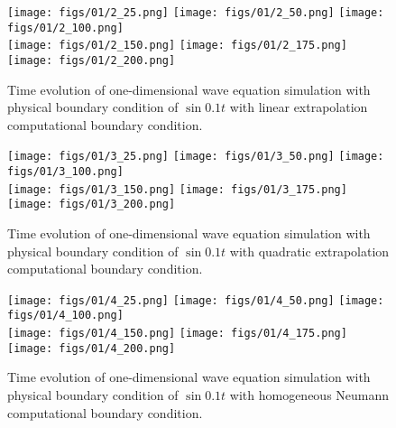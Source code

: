\documentclass[11pt]{article}
\begin{document}
\begin{enumerate}
        \begin{figure}[ht]
        \begin{center}
        \texttt{[image: figs/01/2\_25.png]}
        \texttt{[image: figs/01/2\_50.png]}
        \texttt{[image: figs/01/2\_100.png]}\\
        \texttt{[image: figs/01/2\_150.png]}
        \texttt{[image: figs/01/2\_175.png]}
        \texttt{[image: figs/01/2\_200.png]}\\
        \end{center}
        \caption{Time evolution of one-dimensional wave equation simulation with physical boundary condition
                of $\sin 0.1 t$ with linear extrapolation computational boundary condition.}
        \label{fig2_2}
        \end{figure}

        \begin{figure}[ht]
        \begin{center}
        \texttt{[image: figs/01/3\_25.png]}
        \texttt{[image: figs/01/3\_50.png]}
        \texttt{[image: figs/01/3\_100.png]}\\
        \texttt{[image: figs/01/3\_150.png]}
        \texttt{[image: figs/01/3\_175.png]}
        \texttt{[image: figs/01/3\_200.png]}\\
        \end{center}
        \caption{Time evolution of one-dimensional wave equation simulation with physical boundary condition
                of $\sin 0.1 t$ with quadratic extrapolation computational boundary condition.}
        \label{fig2_3}
        \end{figure}

        \begin{figure}[ht]
        \begin{center}
        \texttt{[image: figs/01/4\_25.png]}
        \texttt{[image: figs/01/4\_50.png]}
        \texttt{[image: figs/01/4\_100.png]}\\
        \texttt{[image: figs/01/4\_150.png]}
        \texttt{[image: figs/01/4\_175.png]}
        \texttt{[image: figs/01/4\_200.png]}\\
        \end{center}
        \caption{Time evolution of one-dimensional wave equation simulation with physical boundary condition
                of $\sin 0.1 t$ with homogeneous Neumann computational boundary condition.}
        \label{fig2_4}
        \end{figure}



\end{enumerate}
\end{document}
